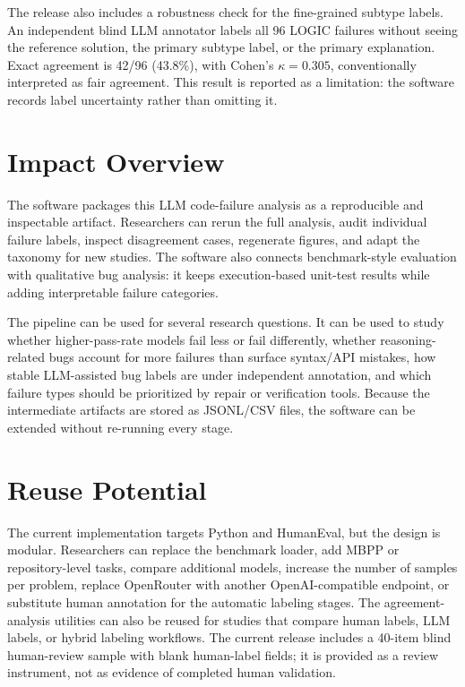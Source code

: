 \documentclass[11pt, letterpaper]{article}
\begin{document}
The release also includes a robustness check for the fine-grained subtype labels.
An independent blind LLM annotator labels all 96 LOGIC failures without seeing the
reference solution, the primary subtype label, or the primary explanation. Exact
agreement is 42/96 (43.8\%), with Cohen's $\kappa=0.305$, conventionally
interpreted as fair agreement. This result is reported as a limitation: the
software records label uncertainty rather than omitting it.

\section*{Impact Overview}
The software packages this LLM code-failure analysis as a reproducible and inspectable
artifact.
Researchers can rerun the full analysis, audit individual failure
labels, inspect disagreement cases, regenerate figures, and adapt the taxonomy for
new studies. The software also connects benchmark-style evaluation with
qualitative bug analysis: it keeps execution-based unit-test results while adding
interpretable failure categories.

The pipeline can be used for several research questions. It can be used to study
whether higher-pass-rate models fail less or fail differently, whether
reasoning-related bugs account for more failures than surface syntax/API mistakes, how stable
LLM-assisted bug labels are under independent annotation, and which failure types
should be prioritized by repair or verification tools. Because the intermediate
artifacts are stored as JSONL/CSV files, the software can be extended without
re-running every stage.

\section*{Reuse Potential}
The current implementation targets Python and HumanEval, but the design is
modular. Researchers can replace the benchmark loader, add MBPP or repository-level
tasks, compare additional models, increase the number of samples per problem,
replace OpenRouter with another OpenAI-compatible endpoint, or substitute human
annotation for the automatic labeling stages. The agreement-analysis utilities can
also be reused for studies that compare human labels, LLM labels, or hybrid
labeling workflows. The current release includes a 40-item blind human-review
sample with blank human-label fields; it is provided as a review instrument, not
as evidence of completed human validation.
\end{document}
